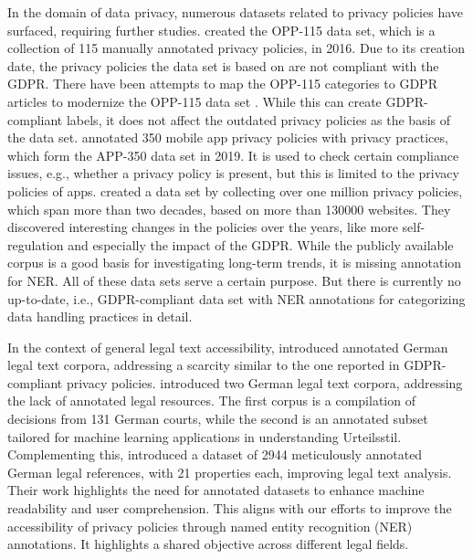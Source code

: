 \documentclass[a4paper,
               biblatex,     %
               hyphens,      %
               ]{jacow}
\begin{document}
In the domain of data privacy, numerous datasets related to privacy policies have surfaced, requiring further studies.
\cite{opp115} created the OPP-115 data set, which is a collection of 115 manually annotated privacy policies, in 2016. 
Due to its creation date, the privacy policies the data set is based on are not compliant with the GDPR. 
There have been attempts to map the OPP-115 categories to GDPR articles to modernize the OPP-115 data set \cite{opp115-gdpr-mapping}. 
While this can create GDPR-compliant labels, it does not affect the outdated privacy policies as the basis of the data set. 
\cite{app350} annotated 350 mobile app privacy policies with privacy practices, which form the APP-350 data set in 2019. 
It is used to check certain compliance issues, e.g., whether a privacy policy is present, but this is limited to the privacy policies of apps.  
\cite{DBLP:journals/corr/abs-2008-09159} created a data set by collecting over one million privacy policies, which span more than two decades, based on more than 130000 websites. 
They discovered interesting changes in the policies over the years, like more self-regulation and especially the impact of the GDPR. 
While the publicly available corpus is a good basis for investigating long-term trends, it is missing annotation for NER.
All of these data sets serve a certain purpose. 
But there is currently no up-to-date, i.e., GDPR-compliant data set with NER annotations for categorizing data handling practices in detail. 

In the context of general legal text accessibility, \cite{icaart21, 10.1145/3594536.3595173} introduced annotated German legal text corpora, addressing a scarcity similar to the one reported in GDPR-compliant privacy policies. \cite{icaart21} introduced two German legal text corpora, addressing the lack of annotated legal resources. The first corpus is a compilation of decisions from 131 German courts, while the second is an annotated subset tailored for machine learning applications in understanding Urteilsstil. Complementing this, \cite{10.1145/3594536.3595173} introduced a dataset of 2944 meticulously annotated German legal references, with 21 properties each, improving legal text analysis. Their work highlights the need for annotated datasets to enhance machine readability and user comprehension. This aligns with our efforts to improve the accessibility of privacy policies through named entity recognition (NER) annotations. It highlights a shared objective across different legal fields.
\end{document}
